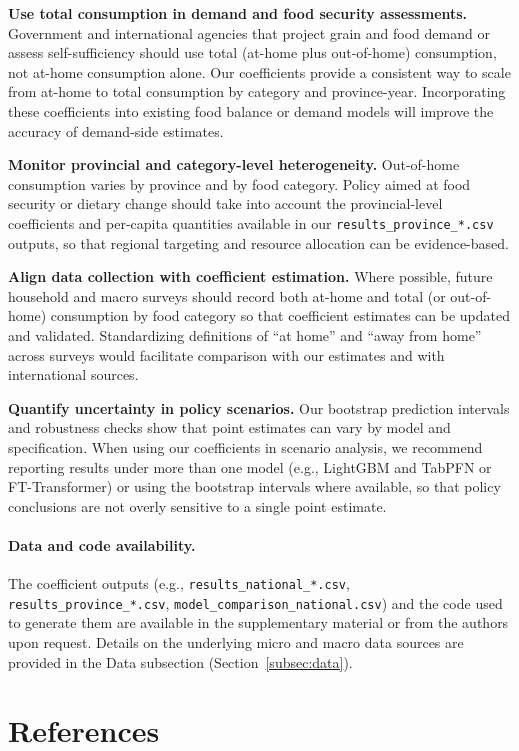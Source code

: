 \documentclass[12pt,a4paper]{article}
\begin{document}
\textbf{Use total consumption in demand and food security assessments.} Government and international agencies that project grain and food demand or assess self-sufficiency should use total (at-home plus out-of-home) consumption, not at-home consumption alone. Our coefficients provide a consistent way to scale from at-home to total consumption by category and province-year. Incorporating these coefficients into existing food balance or demand models will improve the accuracy of demand-side estimates.

\textbf{Monitor provincial and category-level heterogeneity.} Out-of-home consumption varies by province and by food category. Policy aimed at food security or dietary change should take into account the provincial-level coefficients and per-capita quantities available in our \texttt{results\_province\_*.csv} outputs, so that regional targeting and resource allocation can be evidence-based.

\textbf{Align data collection with coefficient estimation.} Where possible, future household and macro surveys should record both at-home and total (or out-of-home) consumption by food category so that coefficient estimates can be updated and validated. Standardizing definitions of ``at home'' and ``away from home'' across surveys would facilitate comparison with our estimates and with international sources.

\textbf{Quantify uncertainty in policy scenarios.} Our bootstrap prediction intervals and robustness checks show that point estimates can vary by model and specification. When using our coefficients in scenario analysis, we recommend reporting results under more than one model (e.g., LightGBM and TabPFN or FT-Transformer) or using the bootstrap intervals where available, so that policy conclusions are not overly sensitive to a single point estimate.

\paragraph{Data and code availability.} The coefficient outputs (e.g., \texttt{results\_national\_*.csv}, \texttt{results\_province\_*.csv}, \texttt{model\_comparison\_national.csv}) and the code used to generate them are available in the supplementary material or from the authors upon request. Details on the underlying micro and macro data sources are provided in the Data subsection (Section~\ref{subsec:data}).

\section*{References}



\end{document}
